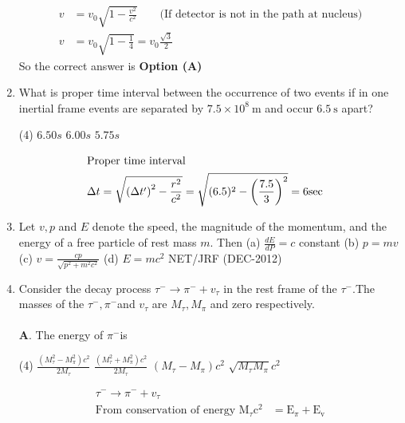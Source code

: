 \begin{enumerate}
\begin{answer}
\begin{align*}
v&=v_{0} \sqrt{1-\frac{v^{2}}{c^{2}}}\quad \quad
\text{(If detector is not in the path at nucleus)}\\
v&=v_{0} \sqrt{1-\frac{1}{4}}=v_{0} \frac{\sqrt{3}}{2}
\end{align*}
So the correct answer is \textbf{Option (A)}
\end{answer}
	\item What is proper time interval between the occurrence of two events if in one inertial frame events are separated by $7.5 \times 10^{8} \mathrm{~m}$ and occur $6.5 \mathrm{~s}$ apart?
{	}
\begin{tasks}(4)
\task[\textbf{A.}] $6.50 s$
\task[\textbf{B.}] $6.00 s$
\task[\textbf{C.}] $5.75 s$
\task[\textbf{D.}] 
\end{tasks}
\begin{answer}
\begin{align*}
\intertext{Proper time interval}
\Delta t&=\sqrt{\left(\Delta t^{\prime}\right)^{2}-\frac{r^{2}}{c^{2}}}=\sqrt{(6.5)^{2}-\left(\frac{7.5}{3}\right)^{2}}=6 \mathrm{sec}
\end{align*}
\end{answer}
	\item Let $v, p$ and $E$ denote the speed, the magnitude of the momentum, and the energy of a free particle of rest mass $m$. Then
	(a) $\frac{d E}{d P}=c$ constant
	(b) $p=m v$
	(c) $v=\frac{c p}{\sqrt{p^{2}+m^{2} c^{2}}}$
	(d) $E=m c^{2}$
	NET/JRF (DEC-2012)
	\item Consider the decay process $\tau^{-} \rightarrow \pi^{-}+v_{\tau}$ in the rest frame of the $\tau^{-} .$The masses of the $\tau^{-}, \pi^{-}$and $v_{\tau}$ are $M_{\tau}, M_{\pi}$ and zero respectively.\\\\
	\textbf{A}. The energy of $\pi^{-}$is
{	}
\begin{tasks}(4)
\task[\textbf{A.}] $\frac{\left(M_{\tau}^{2}-M_{\pi}^{2}\right) c^{2}}{2 M_{\tau}}$
\task[\textbf{B.}] $\frac{\left(M_{\tau}^{2}+M_{\pi}^{2}\right) c^{2}}{2 M_{\tau}}$
\task[\textbf{C.}] $\left(M_{\tau}-M_{\pi}\right) c^{2}$
\task[\textbf{D.}] $\sqrt{M_{\tau} M_{\pi}} c^{2}$
\end{tasks}
\begin{answer}
\begin{align*}
\tau^{-} \rightarrow \pi^{-}+v_{\tau}&\\
\text{From conservation of energy }\mathrm{M}_{\tau} \mathrm{c}^{2}&=\mathrm{E}_{\pi}+\mathrm{E}_{\mathrm{v}}

\end{align*}
\end{answer}
\end{enumerate}
